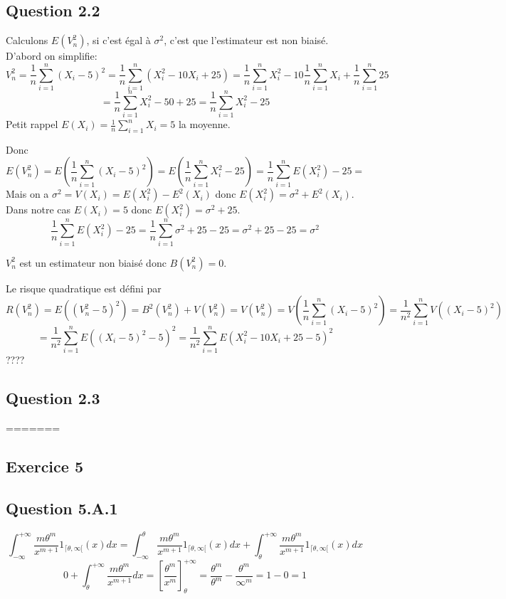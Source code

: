 \documentclass[]{book}
\theoremstyle{definition}
\begin{document}
\subsection*{Question 2.2}
Calculons $E(V_n^2)$, si c'est \'egal \`a $\sigma^2$, c'est que l'estimateur est non biais\'e.
D'abord on simplifie:
$$
V_n^2 = \frac{1}{n}\sum_{i=1}^{n}{(X_i -5)^2} = \frac{1}{n}\sum_{i=1}^{n}{(X_i^2 -10X_i + 25)} = \frac{1}{n}\sum_{i=1}^{n}{X_i^2} -10\frac{1}{n}\sum_{i=1}^{n}{X_i} + \frac{1}{n}\sum_{i=1}^{n}{25}
$$
$$
= \frac{1}{n}\sum_{i=1}^{n}{X_i^2} -50 + 25 = \frac{1}{n}\sum_{i=1}^{n}{X_i^2} -25
$$
Petit rappel $E(X_i) = \frac{1}{n}\sum_{i=1}^{n}{X_i} = 5$ la moyenne.

Donc
$$
E(V_n^2) = E\left(\frac{1}{n}\sum_{i=1}^{n}{(X_i -5)^2}\right) =  E\left(\frac{1}{n}\sum_{i=1}^{n}{X_i^2} -25\right) = \frac{1}{n} \sum_{i=1}^{n}{E(X_i^2)} -25 = 
$$
Mais on a $\sigma^2 = V(X_i) = E(X_i^2) - E^2(X_i) $ donc $E(X_i^2) = \sigma^2 + E^2(X_i)$. Dans notre cas $E(X_i) = 5$ donc $E(X_i^2) = \sigma^2 + 25$.
$$
\frac{1}{n} \sum_{i=1}^{n}{E(X_i^2)} -25 = \frac{1}{n} \sum_{i=1}^{n}{\sigma^2 + 25} -25 = \sigma^2 + 25-25 = \sigma^2  
$$

$V_n^2$ est un estimateur non biais\'e donc $B(V_n^2) = 0$.


Le risque quadratique est d\'efini par
$$
R(V_n^2) = E((V_n^2 - 5)^2) = B^2(V_n^2) + V(V_n^2) = V(V_n^2) = V \left( \frac{1}{n}\sum_{i=1}^{n}{(X_i -5)^2} \right) = \frac{1}{n^2} \sum_{i=1}^{n}{V((X_i -5)^2)}
$$
$$
= \frac{1}{n^2} \sum_{i=1}^{n}{E((X_i -5)^2-5)^2} = \frac{1}{n^2} \sum_{i=1}^{n}{E(X_i^2 - 10 X_i +25 -5)^2}
$$
????

\subsection*{Question 2.3}

=======
\subsection*{Exercice 5}
\subsection*{Question 5.A.1}

$$
\int_{-\infty}^{+\infty}{\frac{m \theta^m}{x^{m+1}}1_{\lceil \theta, \infty[}(x) dx} = 
\int_{-\infty}^{\theta}{\frac{m \theta^m}{x^{m+1}}1_{\lceil \theta, \infty[}(x) dx} + \int_{\theta}^{+\infty}{\frac{m \theta^m}{x^{m+1}}1_{\lceil \theta, \infty[}(x) dx}
$$
$$
0 + \int_{\theta}^{+\infty}{\frac{m \theta^m}{x^{m+1}} dx} =
\left[\frac{\theta^m}{x^m}\right]_{\theta}^{+\infty} =
\frac{\theta^m}{\theta^m} - \frac{\theta^m}{\infty^m} = 1 - 0 = 1
$$
\end{document}
